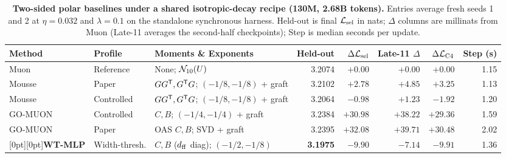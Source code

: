 \begin{table}[!htb]\centering\small
\setlength{\tabcolsep}{4.2pt}
\caption{\textbf{Two-sided polar baselines under a shared isotropic-decay recipe (130M, 2.68B tokens).} Entries average fresh seeds 1 and 2 at $\eta=0.032$ and $\lambda=0.1$ on the standalone synchronous harness. Held-out is final $\mathcal{L}_{\mathrm{sel}}$ in nats; $\Delta$ columns are millinats from Muon (Late-11 averages the second-half checkpoints); Step is median seconds per update.}\label{tab:related}
\begin{tabularx}{\textwidth}{@{}ll>{\raggedright\arraybackslash}Xrrrrr@{}}
\toprule
Method & Profile & Moments \& Exponents & Held-out & $\Delta\mathcal{L}_{\mathrm{sel}}$ & Late-11 $\Delta$ & $\Delta\mathcal{L}_{\mathrm{C4}}$ & Step (s) \\
\midrule
Muon & Reference & None; $\mathcal{N}_{10}(U)$ & 3.2074 & $+0.00$ & $+0.00$ & $+0.00$ & 1.15 \\
Mousse & Paper & $GG^{{\mathsf{T}}}, G^{{\mathsf{T}}}G$; $(-1/8,-1/8)$ + graft & 3.2102 & $+2.78$ & $+4.85$ & $+3.25$ & 1.13 \\
Mousse & Controlled & $GG^{{\mathsf{T}}}, G^{{\mathsf{T}}}G$; $(-1/8,-1/8)$ + graft & 3.2064 & $-0.98$ & $+1.23$ & $-1.92$ & 1.20 \\
GO-MUON & Controlled & $C, B$; $(-1/4,-1/4)$ + graft & 3.2384 & $+30.98$ & $+38.22$ & $+29.36$ & 1.59 \\
GO-MUON & Paper & OAS $C, B$; SVD + graft & 3.2395 & $+32.08$ & $+39.71$ & $+30.48$ & 2.02 \\
\rowcolor{rowtint}[0pt][0pt]\textbf{WT-MLP} & Width-thresh. & $C, B$ ($d_{\mathrm{ff}}$ diag); $(-1/2,-1/8)$ & \textbf{3.1975} & $\mathbf{-9.90}$ & $\mathbf{-7.14}$ & $\mathbf{-9.91}$ & 1.36 \\
\bottomrule\end{tabularx}
\end{table}
